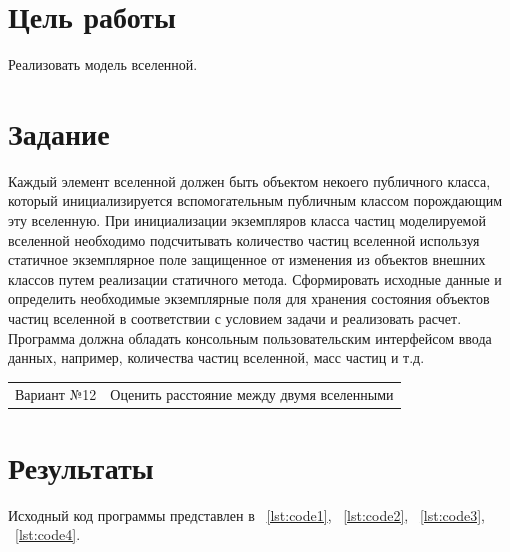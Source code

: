 \documentclass[a4paper, 14pt]{extarticle}
\begin{document}
\renewcommand{\ttdefault}{pcr}

\setlength{\tabcolsep}{3pt}
\newpage
\setcounter{page}{2}

\section{Цель работы}\label{Sect::point}
Реализовать модель вселенной.


\section{Задание}\label{Sect::task}

Каждый элемент вселенной должен быть объектом некоего публичного класса, который инициализируется вспомогательным публичным классом порождающим эту вселенную. При инициализации экземпляров класса частиц моделируемой вселенной необходимо подсчитывать количество частиц вселенной используя статичное экземплярное поле защищенное от изменения из объектов внешних классов путем реализации статичного метода. Сформировать исходные данные и определить необходимые экземплярные поля для хранения состояния объектов частиц вселенной в соответствии с условием задачи и реализовать расчет.
Программа должна обладать консольным пользовательским интерфейсом ввода данных, например, количества частиц вселенной, масс частиц и т.д.

\begin{tabular}{ l | c }
Вариант №12 & Оценить расстояние между двумя вселенными
\end{tabular}



\section{Результаты}\label{Sect::res}

Исходный код программы представлен в ~\ref{lst:code1}, ~\ref{lst:code2}, ~\ref{lst:code3}, ~\ref{lst:code4}.
\end{document}
